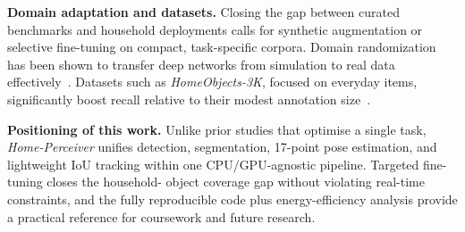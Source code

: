 \textbf{Domain adaptation and datasets.} Closing the gap between
curated benchmarks and household deployments calls for synthetic
augmentation or selective fine-tuning on compact, task-specific
corpora.  Domain randomization has been shown to transfer deep
networks from simulation to real data effectively~\cite{tremblay2018training}.
Datasets such as \emph{HomeObjects-3K}, focused on everyday items,
significantly boost recall relative to their modest annotation
size~\cite{tangaro2025homeobjects3k}.

\textbf{Positioning of this work.} Unlike prior studies that optimise
a single task, \emph{Home-Perceiver} unifies detection, segmentation,
17-point pose estimation, and lightweight IoU tracking within one
CPU/GPU-agnostic pipeline.  Targeted fine-tuning closes the household-
object coverage gap without violating real-time constraints, and the
fully reproducible code plus energy-efficiency analysis provide a
practical reference for coursework and future research.